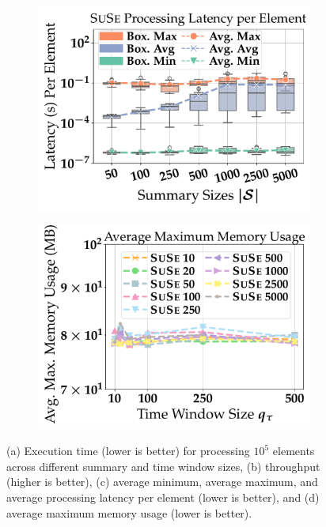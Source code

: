 \begin{figure}[t]
	\vspace{1em} 
    
	\begin{subfigure}{.38\linewidth}
		\centering
		\includegraphics[width=\linewidth]{revision_plots/suse_latencies_boxplot_lineplot.pdf}
		\vspace{-18pt}
		\caption{}
		\label{plot:execution_latency}
	\end{subfigure}
	\hfill
	\begin{subfigure}{.38\linewidth}
		\centering
		\includegraphics[width=\linewidth]{revision_plots/average_maximum_memory_usage.pdf}
		\vspace{-18pt}
		\caption{}
		\label{plot:execution_memory_usage}
	\end{subfigure}

	\vspace{-1em}
	\caption{(a) Execution time (lower is better) for processing $10^5$ elements across different summary and time window sizes, (b) throughput (higher is better), (c) average minimum, average maximum, and average processing latency per element (lower is better), and (d) average maximum memory usage (lower is better).}
	\label{fig:exeuction_time_throughput_latency_memory}
	\vspace{-1em}
\end{figure}


